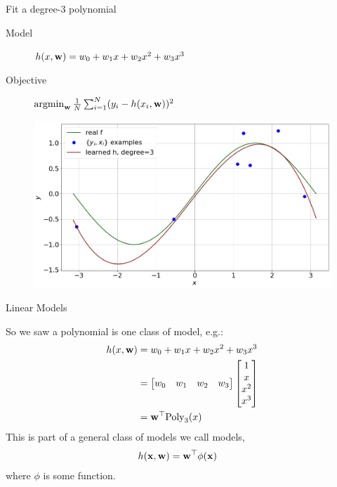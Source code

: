 \documentclass[lualatex, aspectratio=169]{beamer}
\begin{document}
\begin{frame}{Fit a degree-3 polynomial}

  \begin{description}
    \item[Model] $h(x, \mathbf{w}) = w_0 + w_1 x + w_2 x^2 + w_3 x^3$
    \item[Objective] $\argmin_{\v{w}} \frac{1}{N} \sum^N_{i=1} (y_i - h(x_i, \v{w}) )^2$ 
  \end{description}

  \begin{figure}
    \includegraphics[width=0.6\pagewidth]{assets/poly3.png}
  \end{figure}

\end{frame}


\begin{frame}{Linear Models}

  So we saw a polynomial is one class of model, e.g.:
  \begin{align*}
    h(x, \mathbf{w}) &= w_0 + w_1 x + w_2 x^2 + w_3 x^3 \\
                &= \begin{bmatrix} w_0 & w_1 & w_2 & w_3 \end{bmatrix}
                   \begin{bmatrix} 1 \\ x \\ x^2 \\ x^3 \end{bmatrix} \\
                   &= \mathbf{w}^\top \text{Poly}_3(x)
  \end{align*}
  This is part of a general class of models we call  models,
  \begin{align*}
    h(\mathbf{x}, \mathbf{w}) &= \mathbf{w}^\top \phi(\mathbf{x})
  \end{align*}
  where $\phi$ is some function.

\end{frame}
\end{document}
